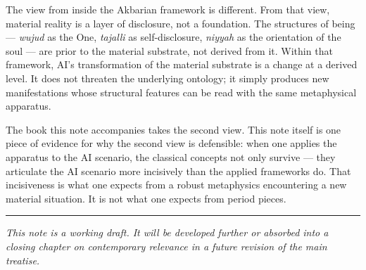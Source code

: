 \documentclass[11pt,a4paper]{article}
\newcommand{\arb}[1]{\textit{#1}}
\begin{document}
The view from inside the Akbarian framework is different. From
that view, material reality is a layer of disclosure, not a
foundation. The structures of being --- \arb{wujud} as the One,
\arb{tajalli} as self-disclosure, \arb{niyyah} as the orientation
of the soul --- are prior to the material substrate, not derived
from it. Within that framework, AI's transformation of the
material substrate is a change at a derived level. It does not
threaten the underlying ontology; it simply produces new
manifestations whose structural features can be read with the
same metaphysical apparatus.

The book this note accompanies takes the second view. This note
itself is one piece of evidence for why the second view is
defensible: when one applies the apparatus to the AI scenario, the
classical concepts not only survive --- they articulate the AI
scenario more incisively than the applied frameworks do. That
incisiveness is what one expects from a robust metaphysics
encountering a new material situation. It is not what one expects
from period pieces.

\vspace{1em}
\hrule
\vspace{0.5em}
\noindent\textit{This note is a working draft. It will be developed
further or absorbed into a closing chapter on contemporary
relevance in a future revision of the main treatise.}
\end{document}
